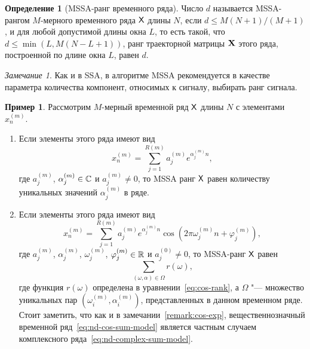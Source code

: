 \documentclass[specialist,
  substylefile=spbu_report.rtx,
subf,href,colorlinks=true, 12pt]{disser}
\theoremstyle{plain}
\theoremstyle{definition}
\newtheorem{definition}{Определение}[section]
\newtheorem{example}{Пример}[section]
\theoremstyle{remark}
\newtheorem{remark}{Замечание}[section]
\begin{document}
\begin{definition}[MSSA-ранг временного ряда]
  \label{def:mssa-rank}
  Число $d$ называется MSSA-рангом $M$-мерного временного ряда $\mathsf{X}$
  длины $N$, если $d \leqslant M(N+1) / (M+1)$,
  и для любой допустимой
  длины окна $L$,
  то есть такой, что $d \leqslant \min(L, M(N- L + 1))$, ранг
  траекторной матрицы $\mathbf{X}$ этого ряда,
  построенной по длине окна $L$, равен $d$.
\end{definition}
\begin{remark}
  Как и в SSA, в алгоритме MSSA рекомендуется в качестве параметра
  количества компонент, относимых к сигналу,
  выбирать ранг сигнала.
\end{remark}
\begin{example}
  \label{ex:mssa-ranks}
  Рассмотрим $M$-мерный временной ряд $\mathsf{X}$ длины $N$ с элементами
  $x_n^{(m)}$.
  \begin{enumerate}
    \item\label{enum:mssa-ranks-complex} Если элементы этого ряда имеют вид
      \begin{equation}
        \label{eq:nd-complex-sum-model}
        x_n^{(m)} = \sum_{j=1}^{R(m)} a_j^{(m)} e^{\alpha_j^{(m)} n},
      \end{equation}
      где $a_j^{(m)}$, $\alpha_j^{(m)} \in \mathbb{C}$ и $a_j^{(m)} \ne 0$,
      то MSSA ранг $\mathsf{X}$ равен количеству уникальных значений $\alpha_j^{(m)}$
      в ряде.
    \item\label{enum:mssa-ranks-real} Если элементы этого ряда имеют вид
      \begin{equation}
        \label{eq:nd-cos-sum-model}
        x_n^{(m)} = \sum_{j=1}^{R(m)} a_j^{(m)} e^{\alpha_j^{(m)} n}
        \cos\left(2 \pi \omega_j^{(m)} n + \varphi_j^{(m)}\right),
      \end{equation}
      где $a_j^{(m)}$, $\alpha_j^{(m)}$, $\omega_j^{(m)}$,
      $\varphi_j^{(m)} \in \mathbb{R}$ и $a_j^{(0)} \ne 0$,
      то MSSA-ранг $\mathsf{X}$ равен
      \begin{equation*}
        \sum_{(\omega, \alpha)\in \Omega} r(\omega),
      \end{equation*}
      где функция $r(\omega)$ определена в уравнении~\eqref{eq:cos-rank},
      а $\Omega$ "--- множество уникальных пар
      \linebreak $\left(\omega_i^{(m)}, \alpha_i^{(m)}\right)$,
      представленных в данном временном ряде.
      Стоит заметить, что как и в замечании~\ref{remark:cos-exp},
      вещественнозначный временной ряд~\eqref{eq:nd-cos-sum-model}
      является частным случаем комплексного
      ряда~\eqref{eq:nd-complex-sum-model}.
  \end{enumerate}
\end{example}
\end{document}
